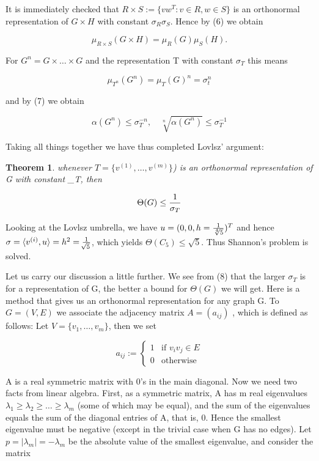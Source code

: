 \documentclass[12pt]{memoir}
\newtheorem{thm}{Theorem}
\newcommand{\setnewpagemargins}{
    \clearpage
    \checkandfixthelayout
}
\begin{document}
It is immediately checked that $R \times S := \{vw^T : v \in R, w \in S\}$ is an
orthonormal representation of $G \times H$ with constant $\sigma_R \sigma_S$. Hence by (6) 
we obtain 

\[
\mu_{R \times S}(G \times H) = \mu_{R}(G)\mu_{S}(H).
\]

For $G^n = G \times \ldots \times G$ and the representation T with constant $\sigma_T$ this
means 

\[
\mu_{T^n}(G^n) = \mu_{T}(G)^n = \sigma_{t}^n
\]

and by (7) we obtain

\[
\alpha(G^n) \leq \sigma_{T}^{-n},  \quad   \sqrt[n]{\alpha(G^n)} \leq \sigma_{T}^{-1}
\]

Taking all things together we have thus completed Lovlsz' argument: 

\begin{thm}\label{theorem}
whenever $T = \{v^{(1)}, \ldots, v^{(m)}\}$) is an orthonormal 
representation of G with constant \sigma_T, then

\begin{equation}
\Theta(G) \leq {1 \over \sigma_T}  \label{eight}
\end{equation}

\end{thm}

Looking at the Lovlsz umbrella, we have $u = (0, 0, h = {1 \over {\sqrt[4]{5}}})^T$ and hence
$\sigma = \langle v^{(i)}, u \rangle = h^2 = {1 \over \sqrt[]{5}}$, which yields $\Theta(C_5) \leq \sqrt{5}$. Thus Shannon's 
problem is solved.


\setnewpagemargins

Let us carry our discussion a little further. We see from (8) that the larger $\sigma_T$
is for a representation of G, the better a bound for $\Theta(G)$ we will get. Here 
is a method that gives us an orthonormal representation for any graph G. 
To $G = (V, E)$ we associate the adjacency matrix $A = (a_{ij})$ , which is 
defined as follows: Let $V = \{v_1,\ldots,v_m\}$, then we set

\[
a_{ij} := \left\{ \begin{array}{rcl}
  1 & \mbox{if $v_i v_j \in E$}
  \\ 0 & \mbox{otherwise}
  \end{array}\right.
\]

A is a real symmetric matrix with 0's in the main diagonal. 
Now we need two facts from linear algebra. First, as a symmetric matrix, 
A has m real eigenvalues $\lambda_1 \geq \lambda_2 \geq \ldots \geq \lambda_m$ \spaceskip(some of which may 
be equal), and the sum of the eigenvalues equals the sum of the diagonal 
entries of A, that is, 0. Hence the smallest eigenvalue must be negative 
(except in the trivial case when G has no edges). Let $p = |\lambda_m| = -\lambda_m$ \spaceskip be 
the absolute value of the smallest eigenvalue, and consider the matrix
\end{document}
